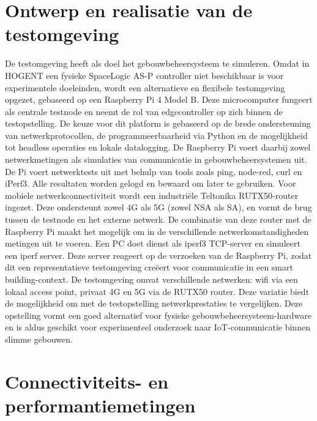 \section{Ontwerp en realisatie van de testomgeving}

De testomgeving heeft als doel het gebouwbeheersysteem te simuleren. Omdat in HOGENT een fysieke SpaceLogic AS-P controller niet beschikbaar is voor experimentele doeleinden, wordt een alternatieve en flexibele testomgeving opgezet, gebaseerd op een Raspberry Pi 4 Model B. Deze microcomputer fungeert als centrale testnode en neemt de rol van edgecontroller op zich binnen de testopstelling. 
De keuze voor dit platform is gebaseerd op de brede ondersteuning van netwerkprotocollen, de programmeerbaarheid via Python en de mogelijkheid tot headless operaties en lokale datalogging. De Raspberry Pi voert daarbij zowel netwerkmetingen als simulaties van communicatie in gebouwbeheersystemen uit.
De Pi voert netwerktests uit met behulp van tools zoals ping, node-red, curl en iPerf3. Alle resultaten worden gelogd en bewaard om later te gebruiken.
Voor mobiele netwerkconnectiviteit wordt een industriële Teltonika RUTX50-router ingezet. Deze ondersteunt zowel 4G als 5G (zowel NSA als SA), en vormt de brug tussen de testnode en het externe netwerk. De combinatie van deze router met de Raspberry Pi maakt het mogelijk om in de verschillende netwerkomstandigheden metingen uit te voeren.
Een PC doet dienst als iperf3 TCP-server en simuleert een iperf server. Deze server reageert op de verzoeken van de Raspberry Pi, zodat dit een representatieve testomgeving creëert voor communicatie in een smart building-context.
De testomgeving omvat verschillende netwerken: wifi via een lokaal access point, privaat 4G en 5G via de RUTX50 router. Deze variatie biedt de mogelijkheid om met de testopstelling netwerkprestaties te vergelijken.
Deze opstelling vormt een goed alternatief voor fysieke gebouwbeheersysteem-hardware en is aldus geschikt voor experimenteel onderzoek naar IoT-communicatie binnen slimme gebouwen.


\section{Connectiviteits- en performantiemetingen}

